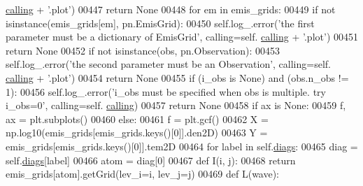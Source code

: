 \begin{DoxyCode}
      \hyperlink{classpyneb_1_1core_1_1diags_1_1_diagnostics_a07dce673fec8b2383ef411ab94b0b2fe}{calling} + \textcolor{stringliteral}{'.plot'})
00447             \textcolor{keywordflow}{return} \textcolor{keywordtype}{None}
00448         \textcolor{keywordflow}{for} em \textcolor{keywordflow}{in} emis\_grids:
00449             \textcolor{keywordflow}{if} \textcolor{keywordflow}{not} isinstance(emis\_grids[em], pn.EmisGrid):
00450                 self.log\_.error(\textcolor{stringliteral}{'the first parameter must be a dictionary of EmisGrid'}, calling=self.
      \hyperlink{classpyneb_1_1core_1_1diags_1_1_diagnostics_a07dce673fec8b2383ef411ab94b0b2fe}{calling} + \textcolor{stringliteral}{'.plot'})
00451                 \textcolor{keywordflow}{return} \textcolor{keywordtype}{None}
00452         \textcolor{keywordflow}{if} \textcolor{keywordflow}{not} isinstance(obs, pn.Observation):
00453             self.log\_.error(\textcolor{stringliteral}{'the second parameter must be an Observation'}, calling=self.
      \hyperlink{classpyneb_1_1core_1_1diags_1_1_diagnostics_a07dce673fec8b2383ef411ab94b0b2fe}{calling} + \textcolor{stringliteral}{'.plot'})
00454             \textcolor{keywordflow}{return} \textcolor{keywordtype}{None}
00455         \textcolor{keywordflow}{if} (i\_obs \textcolor{keywordflow}{is} \textcolor{keywordtype}{None}) \textcolor{keywordflow}{and} (obs.n\_obs != 1):
00456             self.log\_.error(\textcolor{stringliteral}{'i\_obs must be specified when obs is multiple. try i\_obs=0'}, calling=self.
      \hyperlink{classpyneb_1_1core_1_1diags_1_1_diagnostics_a07dce673fec8b2383ef411ab94b0b2fe}{calling})
00457             \textcolor{keywordflow}{return} \textcolor{keywordtype}{None}
00458         \textcolor{keywordflow}{if} ax \textcolor{keywordflow}{is} \textcolor{keywordtype}{None}:
00459             f, ax = plt.subplots()
00460         \textcolor{keywordflow}{else}:
00461             f = plt.gcf()
00462         X = np.log10(emis\_grids[emis\_grids.keys()[0]].den2D)
00463         Y = emis\_grids[emis\_grids.keys()[0]].tem2D
00464         \textcolor{keywordflow}{for} label \textcolor{keywordflow}{in} self.\hyperlink{classpyneb_1_1core_1_1diags_1_1_diagnostics_a0c0f7e36097677f61a6a14a0c3127b02}{diags}:
00465             diag = self.\hyperlink{classpyneb_1_1core_1_1diags_1_1_diagnostics_a0c0f7e36097677f61a6a14a0c3127b02}{diags}[label]
00466             atom = diag[0]
00467             \textcolor{keyword}{def }I(i, j):
00468                 \textcolor{keywordflow}{return} emis\_grids[atom].getGrid(lev\_i=i, lev\_j=j)
00469             \textcolor{keyword}{def }L(wave):

\end{DoxyCode}
